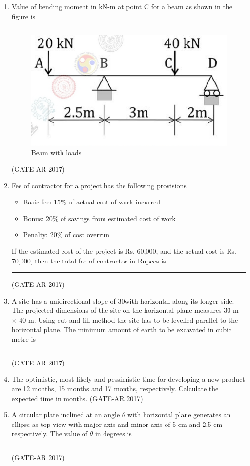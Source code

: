 \documentclass[a4paper,10pt]{article}
\begin{document}
\begin{enumerate}
    \item Value of bending moment in kN-m at point C for a beam as shown in the figure is \rule{2cm}{0.4pt}
    \begin{figure}[h!]
        \centering
        \includegraphics[width=0.5\columnwidth]{figs/02.jpg}
        \caption{Beam with loads}
	\label{fig:Img02}
	\end{figure}
    \hfill (GATE-AR 2017)

    \item Fee of contractor for a project has the following provisions
    \begin{itemize}
    \item Basic fee: 15\% of actual cost of work incurred
    \item Bonus: 20\% of savings from estimated cost of work
    \item Penalty: 20\% of cost overrun
    \end{itemize}
    If the estimated cost of the project is Rs. 60,000, and the actual cost is Rs. 70,000, then the total fee of contractor in Rupees is \rule{2cm}{0.4pt}
    \hfill (GATE-AR 2017)

    \item A site has a unidirectional slope of 30\textdegree with horizontal along its longer side. The projected dimensions of the site on the horizontal plane measures 30 m $\times$ 40 m. Using cut and fill method the site has to be levelled parallel to the horizontal plane. The minimum amount of earth to be excavated in cubic metre is \rule{2cm}{0.4pt}
    \hfill (GATE-AR 2017)

    \item The optimistic, most-likely and pessimistic time for developing a new product are 12 months, 15 months and 17 months, respectively. Calculate the expected time in months. 
    \hfill (GATE-AR 2017)

    \item A circular plate inclined at an angle $\theta$ with horizontal plane generates an ellipse as top view with major axis and minor axis of 5 cm and 2.5 cm respectively. The value of $\theta$ in degrees is \rule{2cm}{0.4pt}
    \hfill (GATE-AR 2017)


\end{enumerate}
\end{document}

